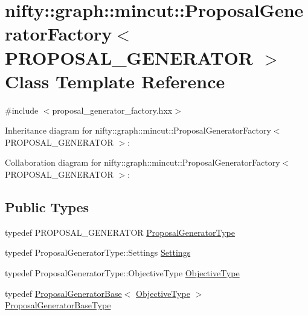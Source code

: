 \hypertarget{classnifty_1_1graph_1_1mincut_1_1ProposalGeneratorFactory}{}\section{nifty\+:\+:graph\+:\+:mincut\+:\+:Proposal\+Generator\+Factory$<$ P\+R\+O\+P\+O\+S\+A\+L\+\_\+\+G\+E\+N\+E\+R\+A\+T\+O\+R $>$ Class Template Reference}
\label{classnifty_1_1graph_1_1mincut_1_1ProposalGeneratorFactory}


{\ttfamily \#include $<$proposal\+\_\+generator\+\_\+factory.\+hxx$>$}



Inheritance diagram for nifty\+:\+:graph\+:\+:mincut\+:\+:Proposal\+Generator\+Factory$<$ P\+R\+O\+P\+O\+S\+A\+L\+\_\+\+G\+E\+N\+E\+R\+A\+T\+O\+R $>$\+:


Collaboration diagram for nifty\+:\+:graph\+:\+:mincut\+:\+:Proposal\+Generator\+Factory$<$ P\+R\+O\+P\+O\+S\+A\+L\+\_\+\+G\+E\+N\+E\+R\+A\+T\+O\+R $>$\+:
\subsection*{Public Types}
\begin{DoxyCompactItemize}
\item 
typedef P\+R\+O\+P\+O\+S\+A\+L\+\_\+\+G\+E\+N\+E\+R\+A\+T\+O\+R \hyperlink{classnifty_1_1graph_1_1mincut_1_1ProposalGeneratorFactory_a16477f085cf5ead9222e5e18635cb9b0}{Proposal\+Generator\+Type}
\item 
typedef Proposal\+Generator\+Type\+::\+Settings \hyperlink{classnifty_1_1graph_1_1mincut_1_1ProposalGeneratorFactory_a7fdfc7569679f720aec5524b1ec1b3e7}{Settings}
\item 
typedef Proposal\+Generator\+Type\+::\+Objective\+Type \hyperlink{classnifty_1_1graph_1_1mincut_1_1ProposalGeneratorFactory_a67d2d70ce78a84ad0b56b8c061539441}{Objective\+Type}
\item 
typedef \hyperlink{classnifty_1_1graph_1_1mincut_1_1ProposalGeneratorBase}{Proposal\+Generator\+Base}$<$ \hyperlink{classnifty_1_1graph_1_1mincut_1_1ProposalGeneratorFactory_a67d2d70ce78a84ad0b56b8c061539441}{Objective\+Type} $>$ \hyperlink{classnifty_1_1graph_1_1mincut_1_1ProposalGeneratorFactory_a9f8c1821263e4763208af8639ea46ec8}{Proposal\+Generator\+Base\+Type}
\end{DoxyCompactItemize}
